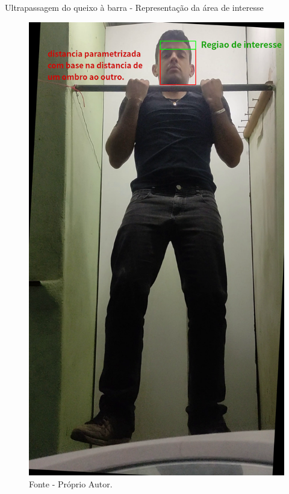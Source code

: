 \begin{frame}{Ultrapassagem do queixo à barra - Representação da área de interesse}
    \begin{figure}[!ht]
        \centering
            \includegraphics[scale=0.1]{img/desenvolvimento/ultrapassagemBarra/representação.png}
        \caption*{Fonte - Próprio Autor.}
    \end{figure}
\end{frame}


